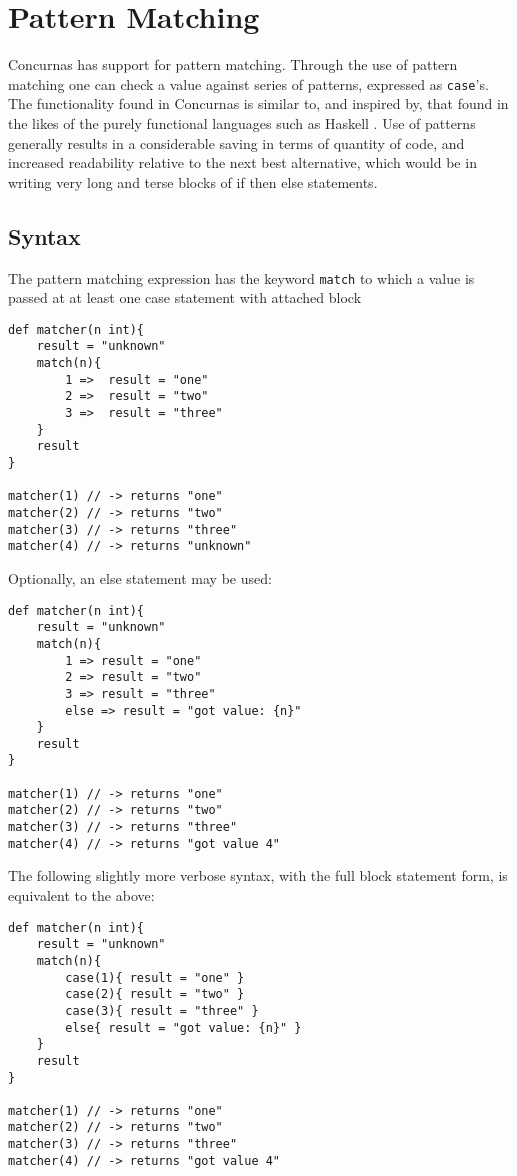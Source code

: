 \documentclass[conc-doc]{subfiles}
\begin{document}
	
	\chapter[Pattern Matching]{Pattern Matching}
Concurnas has support for pattern matching. Through the use of pattern matching one can check a value against series of patterns, expressed as \lstinline{case}'s. The functionality found in Concurnas is similar to, and inspired by, that found in the likes of the purely functional languages such as Haskell . Use of patterns generally results in a considerable saving in terms of quantity of code, and increased readability relative to the next best alternative, which would be in writing very long and terse blocks of if then else statements.

\section{Syntax}
The pattern matching expression has the keyword \lstinline{match} to which a value is passed at at least one case statement with attached block

\begin{lstlisting}
def matcher(n int){
	result = "unknown"
	match(n){
		1 =>  result = "one" 
		2 =>  result = "two" 
		3 =>  result = "three" 
	}
	result
}

matcher(1) // -> returns "one"
matcher(2) // -> returns "two"
matcher(3) // -> returns "three"
matcher(4) // -> returns "unknown"
\end{lstlisting}

Optionally, an else statement may be used:
\begin{lstlisting}
def matcher(n int){
	result = "unknown"
	match(n){
		1 => result = "one" 
		2 => result = "two" 
		3 => result = "three" 
		else => result = "got value: {n}" 
	}
	result
}

matcher(1) // -> returns "one"
matcher(2) // -> returns "two"
matcher(3) // -> returns "three"
matcher(4) // -> returns "got value 4"
\end{lstlisting}

The following slightly more verbose syntax, with the full block statement form, is equivalent to the above:
\begin{lstlisting}
def matcher(n int){
	result = "unknown"
	match(n){
		case(1){ result = "one" }
		case(2){ result = "two" }
		case(3){ result = "three" }
		else{ result = "got value: {n}" }
	}
	result
}

matcher(1) // -> returns "one"
matcher(2) // -> returns "two"
matcher(3) // -> returns "three"
matcher(4) // -> returns "got value 4"
\end{lstlisting}
\end{document}
